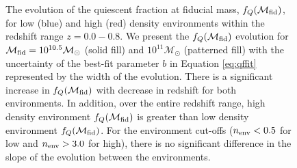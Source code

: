 \documentclass{emulateapj}
\begin{document}
\begin{figure}
    \begin{center}
        \leavevmode
        \caption{The evolution of the quiescent fraction at fiducial mass, $f_{Q}(\mathcal{M}_{\rm{fid}})$, for low (blue) and high (red) density environments within the redshift range $z = 0.0 - 0.8$. We present the $f_{Q}(\mathcal{M}_{\rm{fid}})$ evolution for $\mathcal{M}_{\rm{fid}} = 10^{10.5} \mathcal{M}_\odot$ (solid fill) and $10^{11} \mathcal{M}_\odot$ (patterned fill) with the uncertainty of the best-fit parameter $b$ in Equation \ref{eq:qffit} represented by the width of the evolution. There is a significant increase in $f_{Q}(\mathcal{M}_{\rm{fid}})$ with decrease in redshift for both environments. In addition, over the entire redshift range, high density environment $f_{Q}(\mathcal{M}_{\rm{fid}})$ is greater than low density environment $f_{Q}(\mathcal{M}_{\rm{fid}})$. For the environment cut-offs ($n_{\rm{env}} < 0.5$ for low and $n_{\rm{env}} > 3.0$ for high), there is no significant difference in the slope of the evolution between the environments.}         \label{fig:qffit}
    \end{center}
\end{figure}
\end{document}

